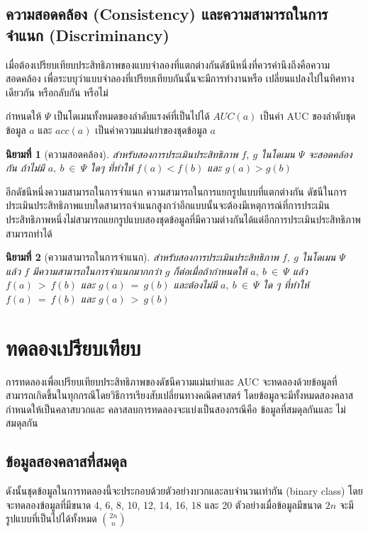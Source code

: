 \documentclass[twoside, twocolumn, 12pt]{article}
\newtheorem{mydef}{นิยามที่}
\begin{document}
\subsection{ความสอดคล้อง (Consistency) และความสามารถในการจำแนก (Discriminancy)}
\quad เมื่อต้องเปรียบเทียบประสิทธิภาพของแบบจำลองที่แตกต่างกันดัชนีหนึ่งที่ควรคำนึงถึงคือความสอดคล้อง เพื่อระบบุว่าแบบจำลองที่เปรียบเทียบกันนั้นจะมีการทำงานหรือ เปลี่ยนแปลงไปในทิศทางเดียวกัน หรือกลับกัน หรือไม่

กำหนดให้ $\Psi$ เป็นโดเมนทั้งหมดของลำดับแรงค์ที่เป็นไปได้ $AUC(a)$ เป็นค่า AUC ของลำดับชุดข้อมูล $a$ และ  $acc(a)$ เป็นค่าความแม่นยำของชุดข้อมูล $a$ 
\begin{mydef}[ความสอดคล้อง]\label{def:ความสอดคล้อง}
สำหรับสองการประเมินประสิทธิภาพ $f,\:g$ ในโดเมน $\Psi$ จะสอดคล้องกัน ถ้าไม่มี $a,\:b\:\in\:\Psi$ ใดๆ ที่ทำให้ $f(a) < f(b)$ และ $g(a) > g(b)$
\end{mydef}

อีกดัชนีหนึ่งความสามารถในการจำแนก ความสามารถในการแยกรูปแบบที่แตกต่างกัน ดัชนีในการประเมินประสิทธิภาพแบบใดสามารถจำแนกสูงกว่าอีกแบบนั้นจะต้องมีเหตุการณ์ที่การประเมินประสิทธิภาพหนึ่งไม่สามารถแยกรูปแบบสองชุดข้อมูลที่มีความต่างกันได้แต่อีกการประเมินประสิทธิภาพสามารถทำได้

\begin{mydef}[ความสามารถในการจำแนก]\label{def:ความสามารถในการจำแนก}
สำหรับสองการประเมินประสิทธิภาพ $f,\:g$ ในโดเมน $\Psi$ แล้ว $f$ มีความสามารถในการจำแนกมากกว่า $g$ ก็ต่อเมื่อถ้ากำหนดให้ $a,\:b\:\in\:\Psi$ แล้ว $f(a)\:>\:f(b)$ และ $g(a)\:=\:g(b)$ และต้องไม่มี $a,\:b\:\in\:\Psi$ ใด ๆ ที่ทำให้ $f(a)\:=\:f(b)$ และ $g(a)\:>\:g(b)$
\end{mydef}

\section{ทดลองเปรียบเทียบ}

\quad การทดลองเพื่อเปรียบเทียบประสิทธิภาพของดัชนีความแม่นยำและ AUC จะทดลองด้วยข้อมูลที่สามารถเกิดขึ้นในทุกกรณีโดยวิธีการเรียงสับเปลี่ยนทางคณิตศาสตร์ โดยข้อมูลจะมีทั้งหมดสองคลาสกำหนดให้เป็นคลาสบวกและ คลาสลบการทดลองจะแบ่งเป็นสองกรณีคือ ข้อมูลที่สมดุลกันและ ไม่สมดุลกัน

\subsection{ข้อมูลสองคลาสที่สมดุล}
\quad ดังนั้นชุดข้อมูลในการทดลองนี้จะประกอบด้วยตัวอย่างบวกและลบจำนวนเท่ากัน (binary class) โดยจะทดลองข้อมูลที่มีขนาด 4, 6, 8, 10, 12, 14, 16, 18 และ 20 ตัวอย่างเมื่อข้อมูลมีขนาด $2n$ จะมีรูปแบบที่เป็นไปได้ทั้งหมด ${{2n}\choose{n}}$ 
\end{document}
